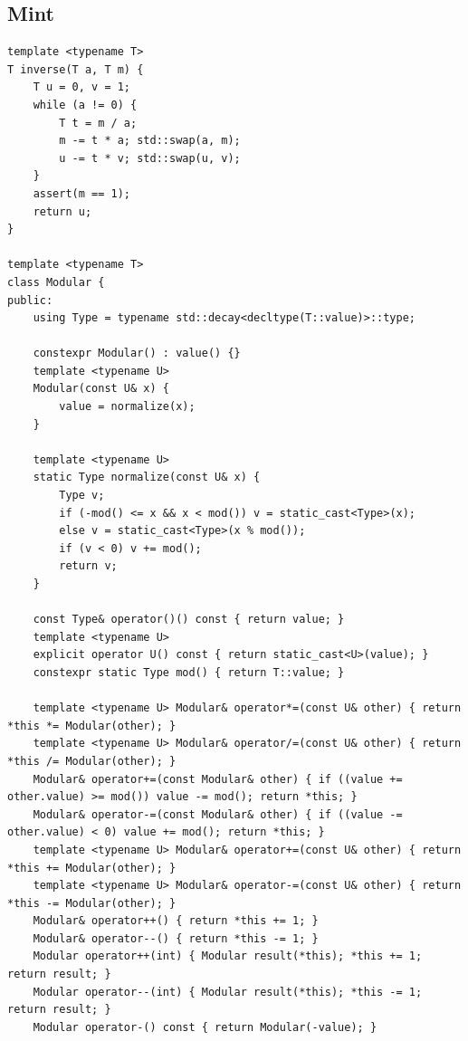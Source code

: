 \documentclass[twoside]{article}
\begin{document}
\subsection{Mint}
\begin{lstlisting}
template <typename T>
T inverse(T a, T m) {
    T u = 0, v = 1;
    while (a != 0) {
        T t = m / a;
        m -= t * a; std::swap(a, m);
        u -= t * v; std::swap(u, v);
    }
    assert(m == 1);
    return u;
}
 
template <typename T>
class Modular {
public:
    using Type = typename std::decay<decltype(T::value)>::type;

    constexpr Modular() : value() {}
    template <typename U>
    Modular(const U& x) {
        value = normalize(x);
    }
 
    template <typename U>
    static Type normalize(const U& x) {
        Type v;
        if (-mod() <= x && x < mod()) v = static_cast<Type>(x);
        else v = static_cast<Type>(x % mod());
        if (v < 0) v += mod();
        return v;
    }
 
    const Type& operator()() const { return value; }
    template <typename U>
    explicit operator U() const { return static_cast<U>(value); }
    constexpr static Type mod() { return T::value; }
 
    template <typename U> Modular& operator*=(const U& other) { return *this *= Modular(other); }
    template <typename U> Modular& operator/=(const U& other) { return *this /= Modular(other); }
    Modular& operator+=(const Modular& other) { if ((value += other.value) >= mod()) value -= mod(); return *this; }
    Modular& operator-=(const Modular& other) { if ((value -= other.value) < 0) value += mod(); return *this; }
    template <typename U> Modular& operator+=(const U& other) { return *this += Modular(other); }
    template <typename U> Modular& operator-=(const U& other) { return *this -= Modular(other); }
    Modular& operator++() { return *this += 1; }
    Modular& operator--() { return *this -= 1; }
    Modular operator++(int) { Modular result(*this); *this += 1; return result; }
    Modular operator--(int) { Modular result(*this); *this -= 1; return result; }
    Modular operator-() const { return Modular(-value); }
 

\end{lstlisting}
\end{document}

